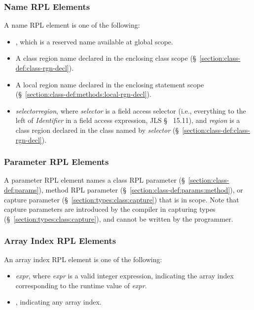 \subsubsection{Name RPL Elements}
\label{section:rpls:elts:name-elts}

A name RPL element is one of the following:
%
\begin{itemize}
%
\item {}, which is a reserved name available at global scope.
%
\item A class region name declared in the enclosing class scope
  (\S~\ref{section:class-def:class-rgn-decl}).
%
\item A local region name declared in the enclosing statement scope
  (\S~\ref{section:class-def:methods:local-rgn-decl}).
%
\item \emph{selector}\emph{region}, where \emph{selector} is a
  field access selector (i.e., everything to the left of
  \emph{Identifier} in a field access expression, JLS \S~
  15.11), and \emph{region} is a class region declared in the class
  named by \emph{selector} (\S~\ref{section:class-def:class-rgn-decl}).
%
\end{itemize}
%

\subsubsection{Parameter RPL Elements}
\label{section:rpls:elts:param}

A parameter RPL element names a class RPL parameter
(\S~\ref{section:class-def:params}), method RPL parameter
(\S~\ref{section:class-def:params:method}), or capture parameter
(\S~\ref{section:types:class:capture}) that is in scope.  Note that
capture parameters are introduced by the compiler in capturing types
(\S~\ref{section:types:class:capture}), and cannot be written by the
programmer.

\subsubsection{Array Index RPL Elements}
\label{section:rpls:elts:array}

An array index RPL element is one of the following:
%
\begin{itemize}
%
\item \kwd{[}\emph{expr}\kwd{]}, where \emph{expr} is a valid integer
  expression, indicating the array index corresponding to the runtime
  value of \emph{expr}.
%
\item \kwd{[?]}, indicating any array index.
%
\end{itemize}

